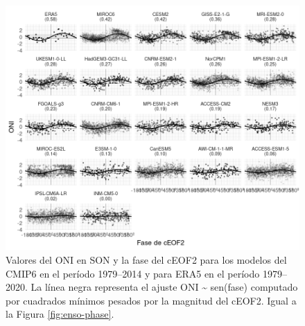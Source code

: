 \documentclass[12pt,oneside,a4paper]{reedthesis}
\begin{document}
\begin{figure}

{\centering \includegraphics{figures/50-cmip6/enso-phase-cmip-1} 

}

\caption{Valores del ONI en SON y la fase del cEOF2 para los modelos del CMIP6 en el período 1979--2014 y para ERA5 en el período 1979--2020. La línea negra representa el ajuste ONI \textasciitilde{} sen(fase) computado por cuadrados mínimos pesados por la magnitud del cEOF2. Igual a la Figura \ref{fig:enso-phase}.}\label{fig:enso-phase-cmip}
\end{figure}
\end{document}
